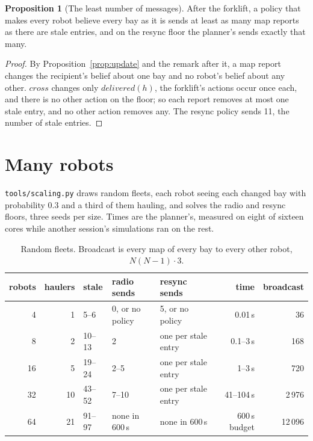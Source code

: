 \documentclass[11pt,a4paper]{article}
\theoremstyle{definition}
\newtheorem{proposition}{Proposition}
\newcommand{\code}[1]{\texttt{\small #1}}
\begin{document}
\begin{proposition}[The least number of messages]
\label{prop:least}
After the forklift, a policy that makes every robot believe every bay as it is
sends at least as many map reports as there are stale entries, and on the resync
floor the planner's sends exactly that many.
\end{proposition}

\begin{proof}
By Proposition~\ref{prop:update} and the remark after it, a map report changes
the recipient's belief about one bay and no robot's belief about any other.
$\mathit{cross}$ changes only $\mathit{delivered}(h)$, the forklift's actions
occur once each, and there is no other action on the floor; so each report
removes at most one stale entry, and no other action removes any. The resync
policy sends 11, the number of stale entries.
\end{proof}

\section{Many robots}
\label{sec:scale}

\code{tools/scaling.py} draws random fleets, each robot seeing each changed bay
with probability 0.3 and a third of them hauling, and solves the radio and resync
floors, three seeds per size. Times are the planner's, measured on eight of
sixteen cores while another session's simulations ran on the rest.

\begin{table}[H]
\centering\small
\begin{tabular}{@{}r r l l l r r@{}}
\toprule
robots & haulers & stale & radio sends & resync sends & time & broadcast \\
\midrule
4 & 1 & 5--6 & 0, or no policy & 5, or no policy & 0.01\,s & 36 \\
8 & 2 & 10--13 & 2 & one per stale entry & 0.1--3\,s & 168 \\
16 & 5 & 19--24 & 2--5 & one per stale entry & 1--3\,s & 720 \\
32 & 10 & 43--52 & 7--10 & one per stale entry & 41--104\,s & 2\,976 \\
64 & 21 & 91--97 & none in 600\,s & none in 600\,s & 600\,s budget & 12\,096 \\
\bottomrule
\end{tabular}
\caption{Random fleets. Broadcast is every map of every bay to every other robot,
$N(N-1)\cdot 3$.}
\label{tab:scale}
\end{table}
\end{document}
